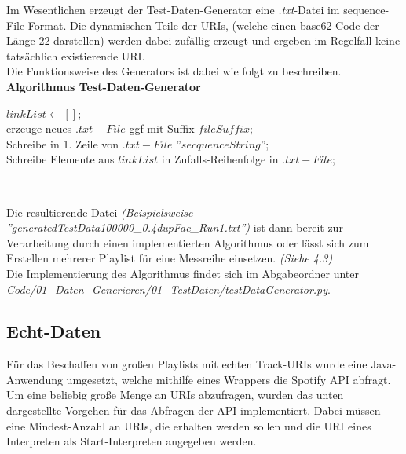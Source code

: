 \documentclass[
10pt, %
a4paper, %
oneside, %
headinclude,footinclude, %
BCOR5mm, %
]{scrartcl}
\begin{document}
Im Wesentlichen erzeugt der Test-Daten-Generator eine \textit{.txt}-Datei im sequence-File-Format. Die dynamischen Teile der URIs, (welche einen base62-Code \cite{SptfyTrackID} der Länge 22 darstellen) werden dabei zufällig erzeugt und ergeben im Regelfall keine tatsächlich existierende URI.\\
Die Funktionsweise des Generators ist dabei wie folgt zu beschreiben. \\

\textbf{Algorithmus Test-Daten-Generator}\\
\begin{algorithm}[H]
	$linkList \leftarrow []$;\\
	erzeuge neues $.txt-File$ ggf mit Suffix $fileSuffix$;\\
	Schreibe in 1. Zeile von $.txt-File$ ''$secquenceString$'';\\
	Schreibe Elemente aus $linkList$ in Zufalls-Reihenfolge in $.txt-File$;\\
\end{algorithm}\

Die resultierende Datei \textit{(Beispielsweise ''generatedTestData100000\_0.4dupFac\_Run1.txt'')} ist dann bereit zur Verarbeitung durch einen implementierten Algorithmus oder lässt sich zum Erstellen mehrerer Playlist für eine Messreihe einsetzen. \textit{(Siehe 4.3)}\\

Die Implementierung des Algorithmus findet sich im Abgabeordner unter \textit{Code/01\_Daten\_Generieren/01\_TestDaten/testDataGenerator.py}.

\subsection{Echt-Daten}
Für das Beschaffen von großen Playlists mit echten Track-URIs wurde eine Java-Anwendung umgesetzt, welche mithilfe eines Wrappers \cite{API} die Spotify API abfragt.\\
Um eine beliebig große Menge an URIs abzufragen, wurden das unten dargestellte Vorgehen für das Abfragen der API implementiert. Dabei müssen eine Mindest-Anzahl an URIs, die erhalten werden sollen und die URI eines Interpreten als Start-Interpreten angegeben werden.\\
\end{document}
